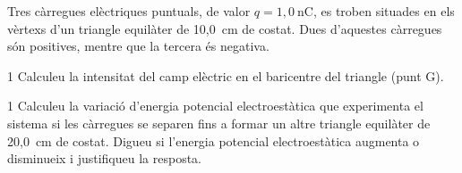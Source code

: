 Tres càrregues elèctriques puntuals, de valor $q = 1,0\ \mathrm{nC}$, es troben situades en els vèrtexs d'un triangle equilàter de 10,0~cm de costat. Dues d'aquestes càrregues són positives, mentre que la tercera és negativa.


\begin{apartat}{1}
Calculeu la intensitat del camp elèctric en el baricentre del triangle (punt G).
\end{apartat}

\begin{apartat}{1}
Calculeu la variació d'energia potencial electroestàtica que experimenta el sistema si les càrregues se separen fins a formar un altre triangle equilàter de 20,0~cm de costat. Digueu si l'energia potencial electroestàtica augmenta o disminueix i justifiqueu la resposta.
\end{apartat}


